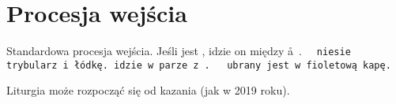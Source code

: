\section{Procesja wejścia}

\begin{itemize*}
	\item Standardowa procesja wejścia. Jeśli jest , idzie on między
	      \aa~. \tt~ niesie trybularz i łódkę.  idzie w parze z \tt. \cc~ ubrany
	      jest w fioletową kapę.
	\item Liturgia może rozpocząć się od kazania (jak w 2019 roku).
\end{itemize*}